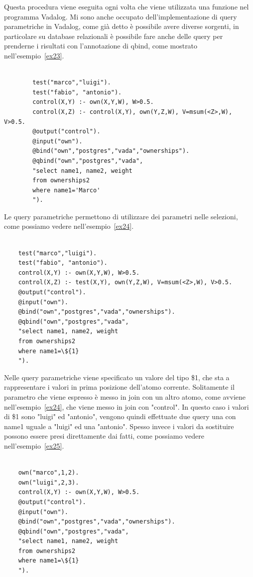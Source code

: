 Questa procedura viene eseguita ogni volta che viene utilizzata una funzione nel programma Vadalog. \newline \newline
Mi sono anche occupato dell'implementazione di query parametriche in Vadalog, come già detto è possibile avere diverse sorgenti, in particolare su database relazionali è possibile fare anche delle query per prenderne i risultati con l'annotazione di qbind, come mostrato nell'esempio~\ref{ex23}.
\begin{example}\label{ex23}
	\begin{lstlisting}
		
		test("marco","luigi").
		test("fabio", "antonio").
		control(X,Y) :- own(X,Y,W), W>0.5.
		control(X,Z) :- control(X,Y), own(Y,Z,W), V=msum(<Z>,W), V>0.5.
		@output("control").
		@input("own").
		@bind("own","postgres","vada","ownerships").
		@qbind("own","postgres","vada",
		"select name1, name2, weight 
		from ownerships2
		where name1='Marco'
		").
	\end{lstlisting}
\end{example}
Le query parametriche permettono di utilizzare dei parametri nelle selezioni, come possiamo vedere nell'esempio~\ref{ex24}.
\begin{example}\label{ex24}
	\begin{lstlisting}
	
	test("marco","luigi").
	test("fabio", "antonio").
	control(X,Y) :- own(X,Y,W), W>0.5.
	control(X,Z) :- test(X,Y), own(Y,Z,W), V=msum(<Z>,W), V>0.5.
	@output("control").
	@input("own").
	@bind("own","postgres","vada","ownerships").
	@qbind("own","postgres","vada",
	"select name1, name2, weight 
	from ownerships2
	where name1=\${1}
	").
	\end{lstlisting}
\end{example}
Nelle query parametriche viene specificato un valore del tipo \${1}, che sta a rappresentare i valori in prima posizione dell'atomo corrente. Solitamente il parametro che viene espresso è messo in join con un altro atomo, come avviene nell'esempio~\ref{ex24}, che viene messo in join con "control". In questo caso i valori di \${1} sono "luigi" ed "antonio", vengono quindi effettuate due query una con name1 uguale a "luigi" ed una "antonio". \newline
Spesso invece i valori da sostituire possono essere presi direttamente dai fatti, come possiamo vedere nell'esempio~\ref{ex25}.
\begin{example}\label{ex25}
	\begin{lstlisting}
	
	own("marco",1,2).
	own("luigi",2,3).
	control(X,Y) :- own(X,Y,W), W>0.5.
	@output("control").
	@input("own").
	@bind("own","postgres","vada","ownerships").
	@qbind("own","postgres","vada",
	"select name1, name2, weight 
	from ownerships2
	where name1=\${1}
	").
	\end{lstlisting}
\end{example}
